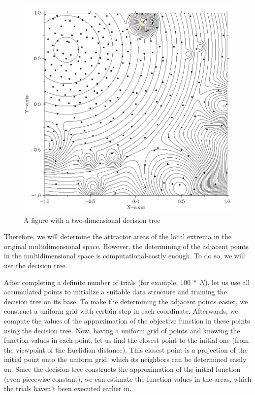 \documentclass{svproc}
\begin{document}
\begin{figure}[ht!] 
	\begin{center} 
		\begin{minipage}[h]{0.6\linewidth} 
			\includegraphics[width=1\linewidth]{figure/fig2.png} 
			\caption{A figure with a two-dimensional decision tree} %
			\label{fig:fig2_2} 
		\end{minipage} 
	\end{center} 
\end{figure}


Therefore, we will determine the attractor areas of the local extrema in the original multidimensional  space. However, the determining of the adjacent points in the multidimensional space is  computational-costly enough. To do so, we will use the decision tree. 

After completing a definite number of trials (for example, $100\ \ast\ N$), let us use all accumulated  points to initialize a suitable data structure and training the decision tree on its base. To make the  determining the adjacent points easier, we construct a uniform grid with certain step in each coordinate.  Afterwards, we compute the values of the approximation of the objective function in these points  using the decision tree. Now, having a uniform grid of points and knowing the function values in each  point, let us find the closest point to the initial one (from the viewpoint of the Euclidian distance). This  closest point is a projection of the initial point onto the uniform grid, which its neighbors can be  determined easily on. Since the decision tree constructs the approximation of the initial function (even  piecewise constant), we can estimate the function values in the areas, which the trials haven’t been  executed earlier in.
\end{document}
